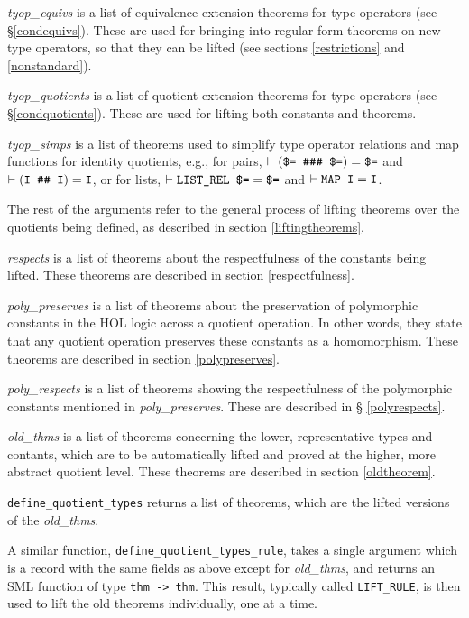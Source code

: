\documentclass[envcountsame,runningheads]{llncs}
\begin{document}
{\it tyop\_equivs\/} is a list of equivalence extension theorems
for type operators
(see
\S\ref{condequivs}).  These are used for
bringing into regular form
theorems on new type operators, so that they can be lifted
(see sections \ref{restrictions} and
\ref{nonstandard}).

{\it tyop\_quotients\/} is a list of quotient extension theorems
for type operators
(see
\S\ref{condquotients}).  These are used for lifting both constants
and theorems.

{\it tyop\_simps\/} is a list of theorems used to simplify type operator
relations and map functions for identity quotients, e.g.,
for pairs,
$\vdash (\mbox{\tt \$= \#\#\# \$=}) = \mbox{\tt \$=}$ and
$\vdash (\mbox{\tt I \#\# I}) = \mbox{\tt I}$,
or for lists,
$\vdash \mbox{\tt LIST\_REL \$=} = \mbox{\tt \$=}$ and
$\vdash \mbox{\tt MAP I} = \mbox{\tt I}$.

The rest of the arguments refer to the general process of lifting theorems
over the quotients being defined,
as described in section \ref{liftingtheorems}.

{\it respects\/} is a list of theorems about the respectfulness of the
constants being lifted. 
These theorems are described in section 
\ref{respectfulness}.

{\it poly\_preserves\/} is a list of theorems about the preservation of
polymorphic constants in the HOL logic
across a quotient operation.
In other words, they state that any quotient operation preserves these
constants as a homomorphism.
These theorems are described in section 
\ref{polypreserves}.

{\it poly\_respects\/} is a list of theorems showing the respectfulness
of the polymorphic constants mentioned in {\it poly\_preserves}.
These are
described in
\S
\ref{polyrespects}.

{\it old\_thms\/} is a list of theorems concerning the lower, representative
types and contants, which are to be automatically lifted and proved at the
higher, more abstract quotient level.
These theorems are described in section \ref{oldtheorem}.

{\tt define\_quotient\_types} returns a list of theorems, which are the
lifted versions of the {\it old\_thms}.

A similar function,
{\tt define\_quotient\_types\_rule}, takes a single argument which is a
record with the same fields as above except for {\it old\_thms},
and returns an SML function of type {\tt thm -> thm}. 
This result, typically called {\tt LIFT\_RULE},
is then used to lift the old theorems individually, one at a time.
\end{document}
